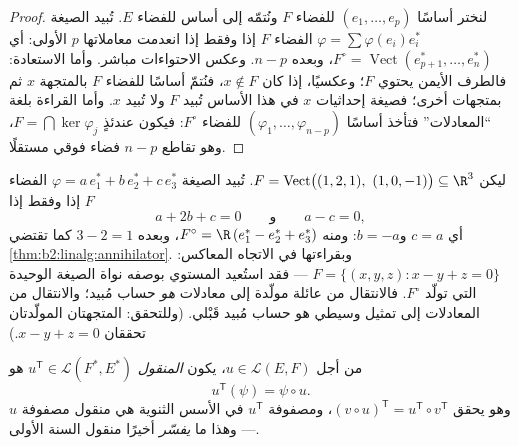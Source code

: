 \begin{proof}
لنختر أساسًا $(e_1, \dots, e_p)$ للفضاء $F$ ونُتمّه إلى أساس للفضاء
$E$. تُبيد الصيغة $\varphi = \sum \varphi(e_i) e_i^*$ الفضاء $F$ إذا وفقط إذا انعدمت
معاملاتها $p$ الأولى: أي $F^\circ =
\operatorname{Vect}(e_{p+1}^*, \dots, e_n^*)$، وبعده $n - p$.
وعكس الاحتواءات مباشر. وأما الاستعادة: فالطرف الأيمن
يحتوي $F$؛ وعكسيًا، إذا كان $x \notin F$، فنُتمّ أساسًا للفضاء
$F$ بالمتجهة $x$ ثم بمتجهات أخرى؛ فصيغة إحداثيات $x$ في هذا
الأساس تُبيد $F$ ولا تُبيد $x$. وأما القراءة بلغة ``المعادلات'' فتأخذ
أساسًا $(\varphi_1, \dots, \varphi_{n-p})$ للفضاء $F^\circ$: فيكون عندئذٍ $F =
\bigcap \ker\varphi_j$، وهو تقاطع $n - p$ فضاء
فوقي مستقلًا.
\end{proof}

\begin{example}\label{ex:b2:linalg:annihilatorwork}
ليكن $F = \operatorname{Vect}\bigl((1, 2, 1),\ (1, 0, -1)\bigr)
\subseteq \R^3$. تُبيد الصيغة $\varphi = a\,e_1^* + b\,e_2^* + c\,e_3^*$
الفضاء $F$ إذا وفقط إذا
\[
a + 2b + c = 0
\qquad\text{و}\qquad
a - c = 0 ,
\]
أي $c = a$ و$b = -a$: ومنه $F^\circ = \R\,(e_1^* - e_2^* +
e_3^*)$، وبعده $3 - 2 = 1$ كما
تقتضي \cref{thm:b2:linalg:annihilator}. وبقراءتها في الاتجاه المعاكس:
$F = \{(x, y, z) : x - y + z = 0\}$ --- فقد استُعيد المستوي بوصفه
نواة الصيغة الوحيدة التي تولّد $F^\circ$. فالانتقال من عائلة
مولّدة إلى معادلات \emph{هو} حساب مُبيد؛
والانتقال من المعادلات إلى تمثيل وسيطي هو حساب
مُبيد قَبْلي. (وللتحقق: المتجهتان المولّدتان تحققان $x - y +
z = 0$.)
\end{example}

\begin{definition}\label{def:b2:linalg:transpose}
من أجل $u \in \mathcal{L}(E, F)$، يكون \emph{المنقول} $u^{\mathsf T} \in \mathcal{L}(F^*, E^*)$ هو
\[
u^{\mathsf T}(\psi) = \psi \circ u .
\]
وهو يحقق $(v \circ u)^{\mathsf T} = u^{\mathsf T} \circ v^{\mathsf
T}$، ومصفوفة $u^{\mathsf T}$ في الأسس الثنوية هي
منقول مصفوفة $u$ --- وهذا ما \emph{يفسّر} أخيرًا
منقول السنة الأولى.
\end{definition}

